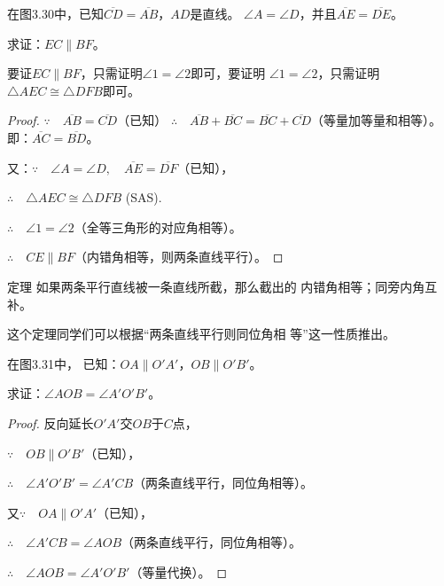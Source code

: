 \begin{example}
    在图3.30中，已知$\overline{CD}=\overline{AB}$，$AD$是直线。
$\angle A=\angle D$，并且$\overline{AE}=\overline{DE}$。

求证：$EC\parallel BF$。

\end{example}

\begin{analyze}
要证$EC\parallel BF$，只需证明$\angle 1=\angle 2$即可，要证明
$\angle 1=\angle 2$，只需证明$\triangle AEC\cong \triangle DFB$即可。
\end{analyze}

\begin{proof}
    $\because\quad \overline{AB}=\overline{CD}$（已知）
    $\therefore\quad \overline{AB}+\overline{BC}=\overline{BC}+\overline{CD}$（等量加等量和相等）。即：$\overline{AC}=\overline{BD}$。

又：$\because\quad \angle A=\angle D,\quad \overline{AE}=\overline{DF}$（已知），

$\therefore\quad \triangle AEC\cong \triangle DFB$ (SAS).

$\therefore\quad \angle 1=\angle 2$（全等三角形的对应角相等）。

$\therefore\quad CE\parallel BF$（内错角相等，则两条直线平行）。
\end{proof}

\begin{Theorem}
  {定理} 如果两条平行直线被一条直线所截，那么截出的
内错角相等；同旁内角互补。  
\end{Theorem}

这个定理同学们可以根据“两条直线平行则同位角相
等”这一性质推出。

\begin{example}
     在图3.31中，
已知：$OA\parallel O'A'$，$OB\parallel O'B'$。

求证：$\angle AOB=\angle A'O'B'$。  
\end{example}

\begin{proof}
    反向延长$O'A'$交$OB$于$C$点，

$\because\quad OB\parallel O'B'$（已知），

$\therefore\quad\angle A'O'B'=\angle A'CB$（两条直线平行，同位角相等）。

又$\because\quad OA\parallel O'A'$（已知），

$\therefore\quad \angle A'CB=\angle AOB$（两条直线平行，同位角相等）。

$\therefore\quad \angle AOB=\angle A'O'B'$（等量代换）。
\end{proof}

